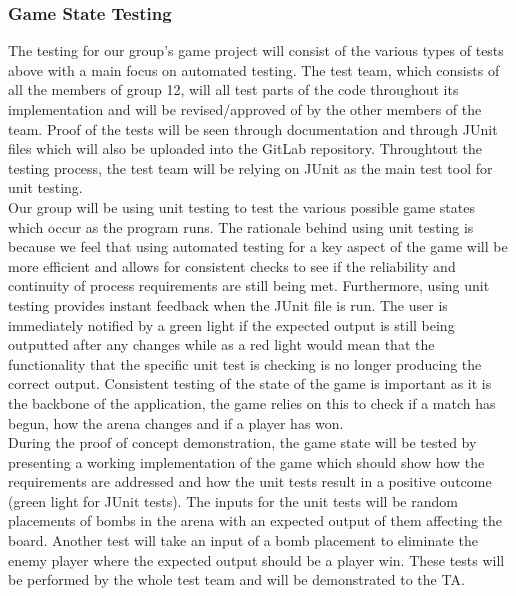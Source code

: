 \documentclass[12pt, letterpaper]{article}
\begin{document}
	\subsubsection{Game State Testing}
	\indent \indent The testing for our group's game project will consist of the various types of tests above with a main focus on automated testing. The test team, which consists of all the members of group 12, will all test parts of the code throughout its implementation and will be revised/approved of by the other members of the team. Proof of the tests will be seen through documentation and through JUnit files which will also be uploaded into the GitLab repository. Throughtout the testing process, the test team will be relying on JUnit as the main test tool for unit testing.\\
	
	Our group will be using unit testing to test the various possible game states which occur as the program runs. The rationale behind using unit testing is because we feel that using automated testing for a key aspect of the game will be more efficient and allows for consistent checks to see if the reliability and continuity of process requirements are still being met. Furthermore, using unit testing provides instant feedback when the JUnit file is run. The user is immediately notified by a green light if the expected output is still being outputted after any changes while as a red light would mean that the functionality that the specific unit test is checking is no longer producing the correct output. Consistent testing of the state of the game is important as it is the backbone of the application, the game relies on this to check if a match has begun, how the arena changes and if a player has won.\\
	
	During the proof of concept demonstration, the game state will be tested by presenting a working implementation of the game which should show how the requirements are addressed and how the unit tests result in a positive outcome (green light for JUnit tests). The inputs for the unit tests will be random placements of bombs in the arena with an expected output of them affecting the board. Another test will take an input of a bomb placement to eliminate the enemy player where the expected output should be a player win. These tests will be performed by the whole test team and will be demonstrated to the TA.
	
\end{document}
